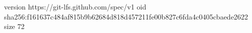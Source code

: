 version https://git-lfs.github.com/spec/v1
oid sha256:f161637c484af815b9b62684d818d457211fe00b827c6fda4c0405cbaede2622
size 72
